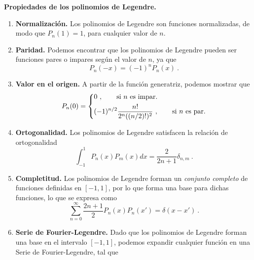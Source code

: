 \begin{propiedad}
    \textbf{Propiedades de los polinomios de Legendre.}

    \begin{enumerate}
        \item \textbf{Normalización.} Los polinomios de Legendre son funciones normalizadas, de modo que $P_n(1) = 1$, para cualquier valor de $n$.
        \item \textbf{Paridad.} Podemos encontrar que los polinomios de Legendre pueden ser funciones pares o impares según el valor de $n$, ya que
        \begin{equation}
            P_n(-x) = (-1)^n P_n(x) \ . 
        \end{equation}
    
        \item \textbf{Valor en el origen.} A partir de la función generatriz, podemos mostrar que
        \begin{equation}
            P_n(0) = \begin{dcases}
                0 \ , \qquad \text{si } n \text{ es impar.} \\
                (-1)^{n/2} \frac{n!}{2^n ((n/2)!)^2} \ , \qquad \text{si } n \text{ es par.}
            \end{dcases}
        \end{equation}
    
        \item \textbf{Ortogonalidad.} Los polinomios de Legendre satisfacen la relación de ortogonalidad
        \begin{equation}
            \int_{-1}^1 P_n(x) P_m(x) dx = \frac{2}{2n+1} \delta_{n,m} \ .
        \end{equation}
    
        \item \textbf{Completitud.} Los polinomios de Legendre forman un \emph{conjunto completo} de funciones definidas en $[-1,1]$, por lo que forma una base para dichas funciones, lo que se expresa como
        \begin{equation}
            \sum_{n=0}^\infty \frac{2n+1}{2} P_n(x) P_n(x') = \delta(x-x') \ .
        \end{equation}
    
        \item \textbf{Serie de Fourier-Legendre.} Dado que los polinomios de Legendre forman una base en el intervalo $[-1,1]$, podemos expandir cualquier función en una Serie de Fourier-Legendre, tal que
    

\end{enumerate}
\end{propiedad}
